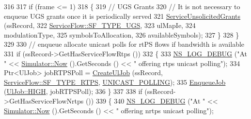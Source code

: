 \begin{DoxyCode}
316 
317                       \textcolor{keywordflow}{if} (frame <= 1)
318                         \{
319                           \textcolor{comment}{// UGS Grants}
320                           \textcolor{comment}{// It is not necessary to enqueue UGS grants once it is periodically served}
321                           \hyperlink{classns3_1_1UplinkSchedulerMBQoS_a3cbff7d3b7d31739806421f0eb2b1cc6}{ServiceUnsolicitedGrants} (ssRecord,
322                                                     \hyperlink{classns3_1_1ServiceFlow_a7990ba10be1e098328fd1e6382a26235a969e0b62fa12fef1dbb23913744ed594}{ServiceFlow::SF\_TYPE\_UGS},
323                                                     ulMapIe,
324                                                     modulationType,
325                                                     symbolsToAllocation,
326                                                     availableSymbols);
327                         \}
328                     \}
329 
330                   \textcolor{comment}{// enqueue allocate unicast polls for rtPS flows if bandwidth is available}
331                   \textcolor{keywordflow}{if} (ssRecord->GetHasServiceFlowRtps ())
332                     \{
333                       \hyperlink{group__logging_ga413f1886406d49f59a6a0a89b77b4d0a}{NS\_LOG\_DEBUG} (\textcolor{stringliteral}{"At "} << \hyperlink{classns3_1_1Simulator_ac3178fa975b419f7875e7105be122800}{Simulator::Now} ().GetSeconds () << \textcolor{stringliteral}{"
       offering rtps unicast polling"});
334                       Ptr<UlJob> jobRTPSPoll = \hyperlink{classns3_1_1UplinkSchedulerMBQoS_a09c9fce5d8872eaf5cdf60209a556e21}{CreateUlJob} (ssRecord, 
      \hyperlink{classns3_1_1ServiceFlow_a7990ba10be1e098328fd1e6382a26235a0e98ff713b932a029acad7e5b24bbf55}{ServiceFlow::SF\_TYPE\_RTPS}, \hyperlink{namespacens3_a534f9a14e4d9aeb5b400e61f152a73a2ab774c9fb3410eec7ee3c8367c50ccbb3}{UNICAST\_POLLING});
335                       \hyperlink{classns3_1_1UplinkSchedulerMBQoS_ad18bfc130fac723e65ada63fc3719b44}{EnqueueJob} (\hyperlink{classns3_1_1UlJob_a6ae1d8e2e490a32ee1bc8aae661f4983a5094609e73e947663a497fd927ce562e}{UlJob::HIGH}, jobRTPSPoll);
336                     \}
337 
338                   \textcolor{keywordflow}{if} (ssRecord->GetHasServiceFlowNrtps ())
339                     \{
340                       \hyperlink{group__logging_ga413f1886406d49f59a6a0a89b77b4d0a}{NS\_LOG\_DEBUG} (\textcolor{stringliteral}{"At "} << \hyperlink{classns3_1_1Simulator_ac3178fa975b419f7875e7105be122800}{Simulator::Now} ().GetSeconds () << \textcolor{stringliteral}{"
       offering nrtps unicast polling"});

\end{DoxyCode}
